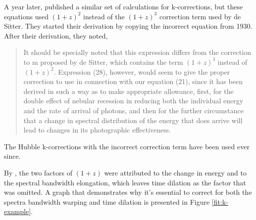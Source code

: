 \documentclass{article}
\begin{document}
A year later, \citet{hubble1935} published a similar set of calculations for
k-corrections, but these equations used $(1 + z)^2$ instead of the $(1 + z)^3$
correction term used by de Sitter. They started their derivation by copying the
incorrect equation from 1930. After their derivation, they noted,

\begin{quote}
It should be specially noted that this expression differs from the correction
to m proposed by de Sitter, which contains the term $(1 + z)^3$ instead of
$(1 + z)^2$. Expression (28), however, would seem to give the proper correction
to use in connection with our equation (21), since it has been derived in such
a way as to make appropriate allowance, first, for the double effect of nebular
recession in reducing both the individual energy and the rate of arrival of
photons, and then for the further circumstance that a change in spectral
distribution of the energy that does arrive will lead to changes in its
photographic effectiveness.
\end{quote}

The Hubble k-corrections with the incorrect correction term have been used ever
since.

By \citet{oke1968}, the two factors of $(1 + z)$ were attributed to the change
in energy and to the spectral bandwidth elongation, which leaves time dilation
as the factor that was omitted. A graph that demonstrates why it's essential to
correct for both the spectra bandwidth warping and time dilation is presented
in Figure \ref{fit:k-example}.
\end{document}
